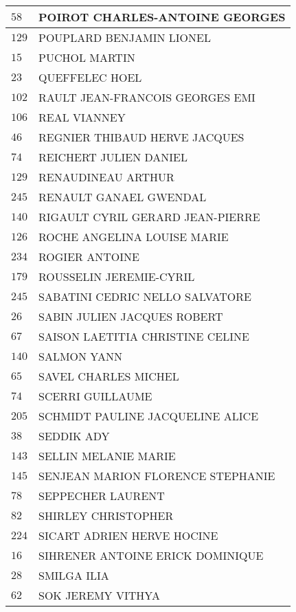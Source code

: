 \begin{xltabular}{\linewidth}{|l|X|}
    \hline
    $58$ & POIROT CHARLES-ANTOINE GEORGES \\
    \hline
    $129$ & POUPLARD BENJAMIN LIONEL \\
    \hline
    $15$ & PUCHOL MARTIN \\
    \hline
    $23$ & QUEFFELEC HOEL \\
    \hline
    $102$ & RAULT JEAN-FRANCOIS GEORGES EMI \\
    \hline
    $106$ & REAL VIANNEY \\
    \hline
    $46$ & REGNIER THIBAUD HERVE JACQUES \\
    \hline
    $74$ & REICHERT JULIEN DANIEL \\
    \hline
    $129$ & RENAUDINEAU ARTHUR \\
    \hline
    $245$ & RENAULT GANAEL GWENDAL \\
    \hline
    $140$ & RIGAULT CYRIL GERARD JEAN-PIERRE \\
    \hline
    $126$ & ROCHE ANGELINA LOUISE MARIE \\
    \hline
    $234$ & ROGIER ANTOINE \\
    \hline
    $179$ & ROUSSELIN JEREMIE-CYRIL \\
    \hline
    $245$ & SABATINI CEDRIC NELLO SALVATORE \\
    \hline
    $26$ & SABIN JULIEN JACQUES ROBERT \\
    \hline
    $67$ & SAISON LAETITIA CHRISTINE CELINE \\
    \hline
    $140$ & SALMON YANN \\
    \hline
    $65$ & SAVEL CHARLES MICHEL \\
    \hline
    $74$ & SCERRI GUILLAUME \\
    \hline
    $205$ & SCHMIDT PAULINE JACQUELINE ALICE \\
    \hline
    $38$ & SEDDIK ADY \\
    \hline
    $143$ & SELLIN MELANIE MARIE \\
    \hline
    $145$ & SENJEAN MARION FLORENCE STEPHANIE \\
    \hline
    $78$ & SEPPECHER LAURENT \\
    \hline
    $82$ & SHIRLEY CHRISTOPHER \\
    \hline
    $224$ & SICART ADRIEN HERVE HOCINE \\
    \hline
    $16$ & SIHRENER ANTOINE ERICK DOMINIQUE \\
    \hline
    $28$ & SMILGA ILIA \\
    \hline
    $62$ & SOK JEREMY VITHYA \\

\end{xltabular}
